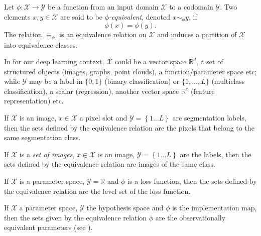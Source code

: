 \documentclass[mathematics,review,submit,moreauthors]{Definitions/mdpi}
\begin{document}
\begin{Definition}\label{def:equivalence}
    Let $\phi : \mathcal{X} \to \mathcal{Y}$ be a function from an input domain $\mathcal{X}$ to a codomain $\mathcal{Y}$.
    Two elements $x, y \in \mathcal{X}$ are said to be \emph{$\phi$-equivalent}, denoted $x \sim_{\phi} y$, if
    \[
        \phi(x) = \phi(y).
    \]
    The relation $\equiv_{\phi}$ is an equivalence relation on $\mathcal{X}$ and induces a partition of $\mathcal{X}$ into equivalence classes.
\end{Definition}
    
In  for our deep learning context, $\mathcal{X}$ could be a vector space $\mathbb{R}^d$, a set of structured objects (images, graphs, point clouds), a function/parameter space etc; while $\mathcal{Y}$ may be a label in $\{0,1\}$ (binary classification) or $\{1,\dots,L\}$ (multiclass classification), a scalar (regression), another vector space $\mathbb{R}^e$ (feature representation) etc.

\begin{Example}\label{ex:image-segmentation}
    If $\mathcal{X}$ is an image, $x\in \mathcal{X}$ a pixel slot and $\mathcal{Y} = \left \{ 1\dots L\right \}$ are segmentation labels, then the sets defined by the equivalence relation are the pixels that belong to the same segmentation class.
\end{Example}

\begin{Example}\label{ex:image-classification}
    If $\mathcal{X}$ is a \emph{set of images}, $x\in \mathcal{X}$ is an image, $\mathcal{Y} = \left \{ 1\dots L\right \}$ are the labels, then the sets defined by the equivalence relation are images of the same class.
\end{Example}

\begin{Example}
    If $\mathcal X$ is a parameter space, $\mathcal{Y} = \mathbb{R}$ and $\phi$ is a loss function, then the sets defined by the equivalence relation are the level set of the loss function.
\end{Example}

\begin{Example}\label{ex:equivalence_observational}
    If $\mathcal{X}$ a parameter space, $\mathcal{Y}$ the hypothesis space and $\phi$ is the implementation map, then the sets given by the equivalence relation $\phi$ are the observationally equivalent parameters (see ).
\end{Example}
\end{document}
